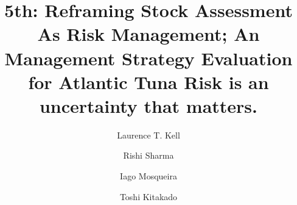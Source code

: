\documentclass[%
nonumbib,      %
%
]{nrc1}                          %
\begin{document}





\title{5th: Reframing Stock Assessment As Risk Management; An Management Strategy Evaluation for Atlantic Tuna
Risk is an uncertainty that matters.}

\author{Laurence T. Kell}        
\address{Centre for Environmental Policy, Imperial College London, London SW7 1N.}

\author{Rishi Sharma}        
\address{}

\author{Iago Mosqueira}        
\address{}

\author{Toshi Kitakado}        
\address{}




\end{document}
